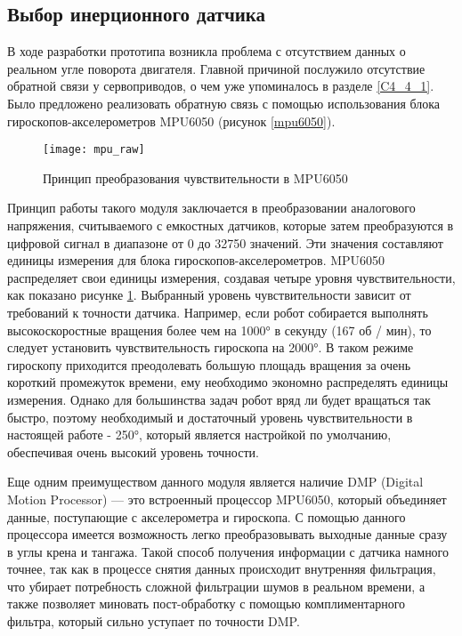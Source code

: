 \subsection{Выбор инерционного датчика}\label{C4_4_3}

В ходе разработки прототипа возникла проблема с отсутствием данных о реальном угле поворота двигателя. Главной причиной послужило отсутствие обратной связи у сервоприводов, о чем уже упоминалось в разделе \ref{C4_4_1}. Было предложено реализовать обратную связь с помощью использования блока гироскопов-акселерометров MPU6050 (рисунок \ref{mpu6050}).
\begin{figure}[h!]
	\begin{center}
		\texttt{[image: mpu\_raw]}
		\caption{Принцип преобразования чувствительности в MPU6050}
		\label{mpu_raw}
	\end{center}
\end{figure}

Принцип работы такого модуля заключается в преобразовании аналогового напряжения, считываемого с емкостных датчиков, которые затем преобразуются в цифровой сигнал в диапазоне от 0 до 32750 значений. Эти значения составляют единицы измерения для блока гироскопов-акселерометров. MPU6050 распределяет свои единицы измерения, создавая четыре уровня чувствительности, как показано рисунке \ref{mpu_raw}. Выбранный уровень чувствительности зависит от требований к точности датчика. Например, если робот собирается выполнять высокоскоростные вращения более чем на 1000° в секунду (167 об / мин), то следует установить чувствительность гироскопа на 2000°. В таком режиме гироскопу приходится преодолевать большую площадь вращения за очень короткий промежуток времени, ему необходимо экономно распределять единицы измерения. Однако для большинства задач робот вряд ли будет вращаться так быстро, поэтому необходимый и достаточный уровень чувствительности в настоящей работе - 250°, который является настройкой по умолчанию, обеспечивая очень высокий уровень точности.

Еще одним преимуществом данного модуля является наличие DMP (Digital Motion Processor) --- это встроенный процессор MPU6050, который объединяет данные, поступающие с акселерометра и гироскопа. С помощью данного процессора имеется возможность легко преобразовывать выходные данные сразу в углы крена и тангажа. Такой способ получения информации с датчика намного точнее, так как в процессе снятия данных происходит внутренняя фильтрация, что убирает потребность сложной фильтрации шумов в реальном времени, а также позволяет миновать пост-обработку с помощью комплиментарного фильтра, который сильно уступает по точности DMP.

